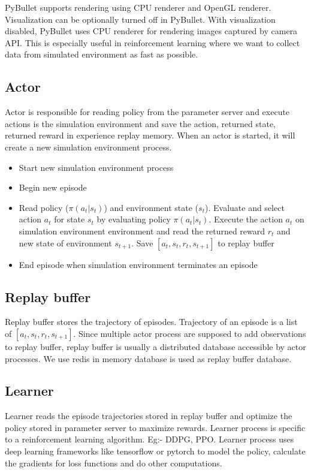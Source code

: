 PyBullet supports rendering using CPU renderer and OpenGL renderer. Visualization can be optionally turned off in PyBullet. With visualization disabled, PyBullet uses CPU renderer for rendering images captured by camera API. This is especially useful in reinforcement learning where we want to collect data from simulated environment as fast as possible.

\subsection{Actor}
Actor is responsible for reading policy from the parameter server and execute actions is the simulation environment and save the action, returned state, returned reward in experience replay memory. When an actor is started, it will create a new simulation environment process. 
\begin{itemize}
	\item Start new simulation environment process
	\item Begin new episode
	\item Read policy ($\pi(a_t|s_t)$) and environment state ($s_t$). Evaluate and select action $a_t$ for state $s_t$ by evaluating policy $\pi(a_t|s_t)$. Execute the action $a_t$ on simulation environment environment and read the returned reward $r_t$ and new state of environment $s_{t+1}$. Save $[a_t, s_t, r_t, s_{t+1}]$ to replay buffer
	\item End episode when simulation environment terminates an episode
\end{itemize}

\subsection{Replay buffer}
Replay buffer stores the trajectory of episodes. Trajectory of an episode is a list of $[a_t, s_t, r_t, s_{t+1}]$. Since multiple actor process are supposed to add observations to replay buffer, replay buffer is usually a distributed database accessible by actor processes. We use redis in memory database is used as replay buffer database.

\subsection{Learner}
Learner reads the episode trajectories stored in replay buffer and optimize the policy stored in parameter server to maximize rewards. Learner process is specific to a reinforcement learning algorithm. Eg:- DDPG, PPO. Learner process uses deep learning frameworks like tensorflow or pytorch to model the policy, calculate the gradients for loss functions and do other computations.

